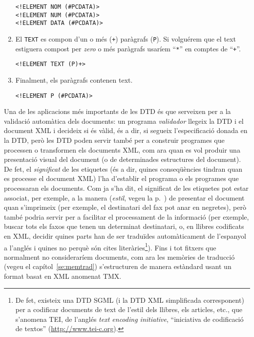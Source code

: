 \begin{enumerate}
\begin{small}
\begin{verbatim}
<!ELEMENT NOM (#PCDATA)>
<!ELEMENT NUM (#PCDATA)>
<!ELEMENT DATA (#PCDATA)>
\end{verbatim}\end{small}
\item El \texttt{TEXT} es compon d'un o més (\texttt{+}) paràgrafs
  (\texttt{P}). Si volguérem que el text estiguera compost per \emph{zero} o
  més paràgrafs usaríem ``\texttt{*}'' en comptes de ``\texttt{+}''.
\begin{small}\begin{verbatim}
<!ELEMENT TEXT (P)+>
\end{verbatim}\end{small}
\item Finalment, els paràgrafs contenen text.
\begin{small}\begin{verbatim}
<!ELEMENT P (#PCDATA)>
\end{verbatim}\end{small}
\end{enumerate}
Una de les aplicacions més importants de les DTD és que serveixen per a la
validació automàtica dels documents: un programa \emph{validador} llegeix la
DTD i el document XML i decideix si és vàlid, és a dir, si segueix
l'especificació donada en la DTD, però les DTD poden servir també per a
construir programes que processen o transformen els documents XML, com ara
quan es vol produir una presentació visual del document (o de determinades
estructures del document).  De fet, el \emph{significat} de les etiquetes (és
a dir, quines conseqüències tindran quan es processe el document XML) l'ha
d'establir el programa o els programes que processaran els documents. Com ja
s'ha dit, el significat de les etiquetes pot estar associat, per exemple, a la
manera (\emph{estil}, vegeu la p.~\pageref{pg:estil}) de presentar el document
quan s'imprimeix (per exemple, el destinatari del fax pot anar en negretes),
però també podria servir per a facilitar el processament de la informació (per
exemple, buscar tots els faxos que tenen un determinat destinatari, o, en
llibres codificats en XML, decidir quines parts han de ser traduïdes
automàticament de l'espanyol a l'anglés i quines no perquè són cites
literàries\footnote{De fet, existeix una DTD SGML (i la DTD XML simplificada
  corresponent) per a codificar documents de text de l'estil dels llibres, els
  articles, etc., que s'anomena TEI, de l'anglés \emph{text encoding
    initiative}, ``iniciativa de codificació de textos''
  (\url{http://www.tei-c.org}).}). Fins i tot fitxers que normalment no
consideraríem documents, com ara les memòries de traducció (vegeu el
capítol~\ref{se:memtrad}) s'estructuren de manera estàndard usant un format
basat en XML anomenat TMX.  


